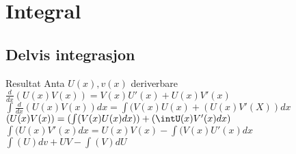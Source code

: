\documentclass{article}
\begin{document}
\section{Integral}
	\subsection{Delvis integrasjon}
		Resultat
		Anta $U(x), v(x)$ deriverbare \\
		$\frac{d}{dx}(U(x)V(x)) = V(x)U'(x)+U(x)V'(x)$\\
		$\int\frac{d}{dx}(U(x)V(x))dx = \int(V(x)U(x)+(U(x)V'(X))dx$\\
		$(U(x)V(x)) = (\int(V(x)U(x)dx)) + (\intU(x)V'(x)dx)$\\
		$\int(U(x)V'(x)dx = U(x)V(x) - \int(V(x)U'(x)dx$\\
		$\int(U)dv + UV - \int(V)dU$
		
\end{document}
